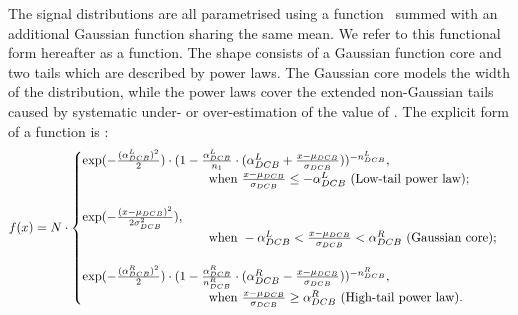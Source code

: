 The signal \mgg distributions are all parametrised using a \DCB function~\cite{CrystalBallFunction} summed with an additional Gaussian function sharing the same mean. We refer to this functional form hereafter as a \DCBpG function. %
The \DCB shape consists of a Gaussian function core and two tails which are described by power laws. The Gaussian core models the width of the distribution, while the power laws cover the extended non-Gaussian tails caused by systematic under- or over-estimation of the value of \mgg. %
The explicit form of a \DCB function is :
\begin{equation}
\label{eq:DCB_form}
f(x)= N \cdot \begin{cases} 
\exp(-\frac{(\alpha_{DCB}^{L})^2}{2}) \cdot (1-\frac{\alpha_{DCB}^{L}}{n_1}\cdot (\alpha_{DCB}^{L} +\frac{x-\mu_{DCB}}{\sigma_{DCB}}))^{-n_{DCB}^{L}}, \\
\hspace{3.5cm} \text{when } \frac{x-\mu_{DCB}}{\sigma_{DCB}} \leq -\alpha_{DCB}^{L} \text{ (Low-tail power law)}; \\ 
\\
\exp (-\frac{(x-\mu_{DCB})^{2}}{2\sigma_{DCB}^2}), \\
 \hspace{3.5cm} \text{when } -\alpha_{DCB}^{L} < \frac{x-\mu_{DCB}}{\sigma_{DCB}} < \alpha_{DCB}^{R} \text{ (Gaussian core)}; \\ 
 \\
\exp(-\frac{(\alpha_{DCB}^{R})^2}{2}) \cdot (1-\frac{\alpha_{DCB}^{R}}{n_{DCB}^{R}}\cdot (\alpha_{DCB}^{R} - \frac{x-\mu_{DCB}}{\sigma_{DCB}}))^{-n_{DCB}^{R}},\\
 \hspace{3.5cm} \text{when } \frac{x-\mu_{DCB}}{\sigma_{DCB}} \geq \alpha_{DCB}^{R} \text{ (High-tail power law)}. \\
\end{cases}
\end{equation}
